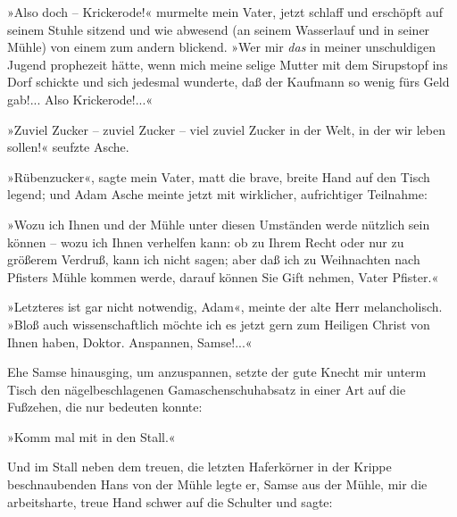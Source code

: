 »Also doch – Krickerode!« murmelte mein Vater, jetzt schlaff und
erschöpft auf seinem Stuhle sitzend und wie abwesend (an seinem
Wasserlauf und in seiner Mühle) von einem zum andern blickend. »Wer
mir \emph{das} in meiner unschuldigen Jugend prophezeit hätte, wenn
mich meine selige Mutter mit dem Sirupstopf ins Dorf schickte und
sich jedesmal wunderte, daß der Kaufmann so wenig fürs Geld gab!...
Also Krickerode!...«

»Zuviel Zucker – zuviel Zucker – viel zuviel Zucker in der Welt, in
der wir leben sollen!« seufzte Asche.

»Rübenzucker«, sagte mein Vater, matt die brave, breite Hand auf
den Tisch legend; und Adam Asche meinte jetzt mit wirklicher,
aufrichtiger Teilnahme:

»Wozu ich Ihnen und der Mühle unter diesen Umständen werde nützlich
sein können – wozu ich Ihnen verhelfen kann: ob zu Ihrem Recht oder
nur zu größerem Verdruß, kann ich nicht sagen; aber daß ich zu
Weihnachten nach Pfisters Mühle kommen werde, darauf können Sie
Gift nehmen, Vater Pfister.«

»Letzteres ist gar nicht notwendig, Adam«, meinte der alte Herr
melancholisch. »Bloß auch wissenschaftlich möchte ich es jetzt gern
zum Heiligen Christ von Ihnen haben, Doktor. Anspannen, Samse!...«

Ehe Samse hinausging, um anzuspannen, setzte der gute Knecht mir
unterm Tisch den nägelbeschlagenen Gamaschenschuhabsatz in einer
Art auf die Fußzehen, die nur bedeuten konnte:

»Komm mal mit in den Stall.«

Und im Stall neben dem treuen, die letzten Haferkörner in der
Krippe beschnaubenden Hans von der Mühle legte er, Samse aus der
Mühle, mir die arbeitsharte, treue Hand schwer auf die Schulter und
sagte:

